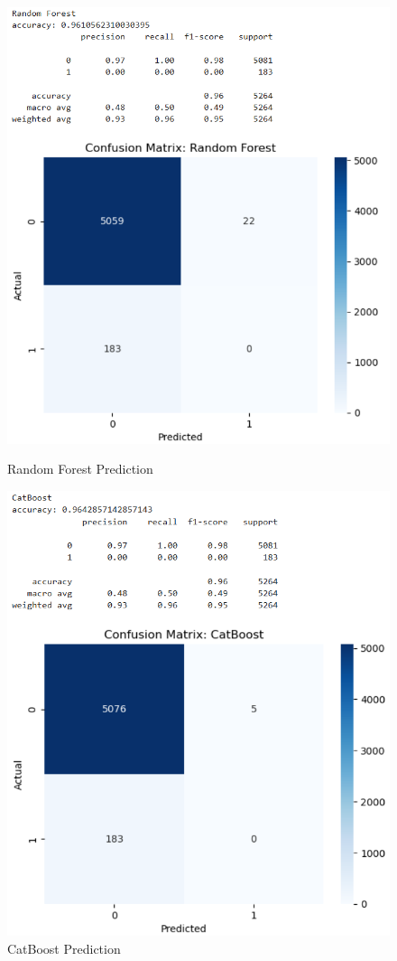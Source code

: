 \documentclass{article}
\begin{document}
\begin{figure}[h!]
	\begin{minipage}{0.48\textwidth}
		\centering
		\includegraphics[width=0.6\linewidth]{../Image/P39.jpg}
		\caption{Random Forest Prediction}
		\label{fig:P39}
	\end{minipage}\hfill
	\begin{minipage}{0.48\textwidth}
		\centering
		\includegraphics[width=0.6\linewidth]{../Image/P40.jpg}
		\caption{CatBoost Prediction}
		\label{fig:P40}
	\end{minipage}
\end{figure}
\newpage
\end{document}
